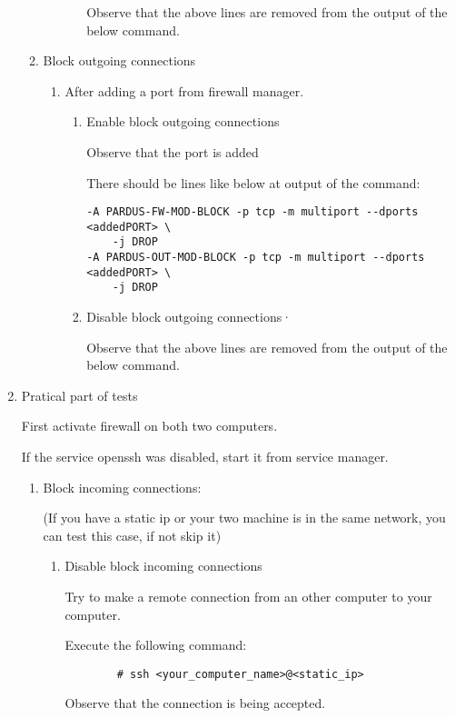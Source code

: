 \documentclass[a4paper,10pt]{article}
\begin{document}
\begin{enumerate}
\begin{enumerate}
\begin{enumerate}
\begin{enumerate}
    	Observe that the above lines are removed from the output of the below command.
        \end{enumerate}
    \end{enumerate}

\item Block outgoing connections 
\begin{enumerate}
    \item After adding a port from firewall manager.
        \begin{enumerate}
        \item Enable block outgoing connections

            Observe that the port is added

            There should be lines like below at output of the command:

\begin{verbatim}
-A PARDUS-FW-MOD-BLOCK -p tcp -m multiport --dports <addedPORT> \
    -j DROP
-A PARDUS-OUT-MOD-BLOCK -p tcp -m multiport --dports <addedPORT> \
    -j DROP
\end{verbatim} 

        \item Disable block outgoing connections·

              Observe that the above lines are removed from the output of the below command.
        \end{enumerate}
    \end{enumerate}
\end{enumerate}
\item Pratical part of tests

	First activate firewall on both two computers.	

    	If the service openssh was disabled, start it from service manager.
\begin{enumerate}
    \item Block incoming connections: 

	
		(If you have a static ip or your two machine is in the same network, you can test this case, if not skip it)
    \begin{enumerate}
        \item Disable block incoming connections

              Try to make a remote connection from an other computer to your computer.

              Execute the following command:
		\begin{verbatim}
		# ssh <your_computer_name>@<static_ip>
		\end{verbatim} 
              Observe that the connection is being accepted.


\end{enumerate}
\end{enumerate}
\end{enumerate}
\end{document}
